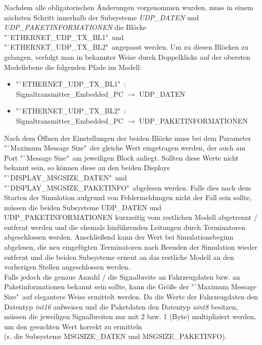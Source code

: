 \documentclass[fontsize = 12pt, paper = a4]{scrreprt}
\begin{document}
\newpage

Nachdem alle obligatorischen Änderungen vorgenommen wurden, muss in einem nächsten Schritt innerhalb der Subsysteme \textit{UDP\_DATEN} und \textit{UDP\_PAKETINFORMATIONEN} die Blöcke "`ETHERNET\_UDP\_TX\_BL1"\ und "`ETHERNET\_UDP\_TX\_BL2"\ angepasst werden. Um zu diesen Blöcken zu gelangen, verfolgt man in bekannter Weise durch Doppelklicks auf der obersten Modellebene die folgenden Pfade im Modell: 

\begin{itemize}[leftmargin=*]

\item "`ETHERNET\_UDP\_TX\_BL1"\ : \\ Signaltransmitter\_Embedded\_PC $\rightarrow$ UDP\_DATEN 

\item "`ETHERNET\_UDP\_TX\_BL2"\ : \\ Signaltransmitter\_Embedded\_PC $\rightarrow$ UDP\_PAKETINFORMATIONEN

\end{itemize}

Nach dem Öffnen der Einstellungen der beiden Blöcke muss bei dem Parameter "`Maximum Message Size"\ der gleiche Wert eingetragen werden, der auch am Port "`Message Size"\ am jeweiligen Block anliegt. Sollten diese Werte nicht bekannt sein, so können diese an den beiden Displays "`DISPLAY\_MSGSIZE\_DATEN"\ und "`DISPLAY\_MSGSIZE\_PAKETINFO"\ abgelesen werden. Falls dies nach dem Starten der Simulation aufgrund von Fehlermeldungen nicht der Fall sein sollte, müssen die beiden Subsysteme UDP\_DATEN und UDP\_PAKETINFORMATIONEN kurzzeitig vom restlichen Modell abgetrennt / entfernt werden und die ehemals hinführenden Leitungen durch Terminatoren abgeschlossen werden. Anschließend kann der Wert bei Simulationsbeginn abgelesen, die neu eingefügten Terminatoren nach Beenden der Simulation wieder entfernt und die beiden Subsysteme erneut an das restliche Modell an den vorherigen Stellen angeschlossen werden. \\ 

Falls jedoch die genaue Anzahl / die Signalbreite an Fahrzeugdaten bzw. an Paketinformationen bekannt sein sollte, kann die Größe der "`Maximum Message Size"\ auf elegantere Weise ermittelt werden. Da die Werte der Fahrzeugdaten den Datentyp \textit{int16} aufweisen und die Paketdaten den Datentyp \textit{uint8} besitzen, müssen die jeweiligen Signalbreiten nur mit 2 bzw. 1 (Byte) multipliziert werden, um den gesuchten Wert korrekt zu ermitteln \\ (s. die Subsysteme MSGSIZE\_DATEN und MSGSIZE\_PAKETINFO). \\  
\end{document}
